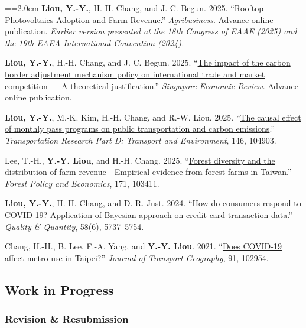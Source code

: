 \documentclass[11pt,letterpaper]{article}
\newenvironment{hanglist}{\par\setlength{\parindent}{0pt}\everypar={\hangindent=2.0em\hangafter=1}}{\par}
\begin{document}
\begin{hanglist}
\textbf{Liou, Y.-Y.}, H.-H. Chang, and J. C. Begun. 2025. ``\href{https://onlinelibrary.wiley.com/doi/abs/10.1002/agr.70035}{Rooftop Photovoltaics Adoption and Farm Revenue}.'' \emph{Agribusiness}. Advance online publication. \newline \textit{Earlier version presented at the 18th Congress of EAAE (2025) and the 19th EAEA International Convention (2024).}

\textbf{Liou, Y.-Y.}, H.-H. Chang, and J. C. Begun. 2025. ``\href{https://www.worldscientific.com/doi/10.1142/S0217590825500328}{The impact of the carbon border adjustment mechanism policy on international trade and market competition --- A theoretical justification}.'' \emph{Singapore Economic Review}. Advance online publication.

\textbf{Liou, Y.-Y.}, M.-K. Kim, H.-H. Chang, and R.-W. Liou. 2025. ``\href{https://doi.org/10.1016/j.trd.2025.104903}{The causal effect of monthly pass programs on public transportation and carbon emissions}.'' \emph{Transportation Research Part D: Transport and Environment}, 146, 104903.

Lee, T.-H., \textbf{Y.-Y. Liou}, and H.-H. Chang. 2025. ``\href{https://doi.org/10.1016/j.forpol.2024.103411}{Forest diversity and the distribution of farm revenue - Empirical evidence from forest farms in Taiwan}.'' \emph{Forest Policy and Economics}, 171, 103411.

\textbf{Liou, Y.-Y.}, H.-H. Chang, and D. R. Just. 2024. ``\href{https://link.springer.com/article/10.1007/s11135-024-01915-9}{How do consumers respond to COVID-19? Application of Bayesian approach on credit card transaction data}.'' \emph{Quality \& Quantity}, 58(6), 5737--5754.

Chang, H.-H., B. Lee, F.-A. Yang, and \textbf{Y.-Y. Liou}. 2021. ``\href{https://doi.org/10.1016/j.jtrangeo.2021.102954}{Does COVID-19 affect metro use in Taipei?}'' \emph{Journal of Transport Geography}, 91, 102954.

\end{hanglist}

\hypertarget{work-in-progress}{%
\subsection{Work in Progress}\label{work-in-progress}}

\hypertarget{revision-resubmission}{%
\subsubsection{Revision \& Resubmission}\label{revision-resubmission}}
\end{document}
